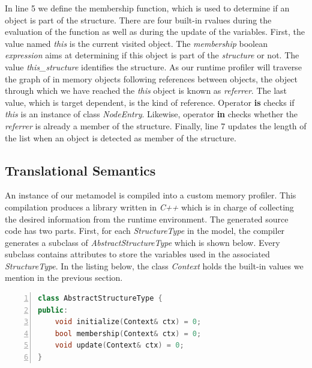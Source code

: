 In line 5 we define the membership function, which is used to determine if an object is part of the structure.
There are four built-in rvalues during the evaluation of the function as well as during the update of the variables.
First, the value named \textit{this} is the current visited object. 
The \textit{membership} boolean \textit{expression} aims at determining if this object is part of the \textit{structure} or not. 
The value \textit{this\_structure} identifies the structure.
As our runtime profiler will traverse the graph of in memory objects following references between objects, the object through which we have reached the \textit{this} object is known as \textit{referrer}.
The last value, which is target dependent, is the kind of reference.
Operator \textbf{is} checks if \textit{this} is an instance of class \textit{NodeEntry}.
Likewise, operator \textbf{in} checks whether the \textit{referrer} is already a member of the structure.
Finally, line 7 updates the length of the list when an object is detected as member of the structure.

\subsection{Translational Semantics}\label{sec:semantic}

An instance of our metamodel is compiled into a custom memory profiler.
This compilation produces a library written in \textit{C++} which is in charge of collecting the desired information from the runtime environment.
The generated source code has two parts.
First, for each \textit{StructureType} in the model, the compiler generates a subclass of \textit{AbstractStructureType} which is shown below.
Every subclass contains attributes to store the variables used in the associated \textit{StructureType}.
In the listing below, the class \textit{Context} holds the built-in values we mention in the previous section.
\begin{lstlisting}[language=C++, frame=tblr,
numbers=left,
numberstyle=\color{black}\scriptsize,]
class AbstractStructureType {
public:
	void initialize(Context& ctx) = 0;
	bool membership(Context& ctx) = 0;
	void update(Context& ctx) = 0;
}
\end{lstlisting}

